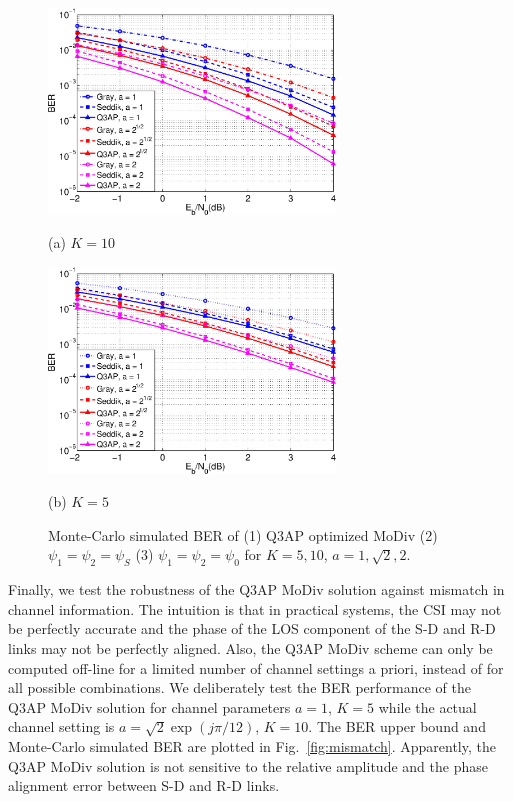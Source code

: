 \documentclass[journal,draftcls,onecolumn,12pt,twoside]{IEEEtran}
\begin{document}
\begin{figure}[!t]
    \begin{minipage}[b]{0.49\linewidth}
      \centering
      \centerline{\includegraphics[width=3.0in]{./figs/MC_10.eps}}
      \centerline{(a) $ K = 10$}\medskip
    \end{minipage}
    \hfill
    \begin{minipage}[b]{0.49\linewidth}
      \centering
      \centerline{\includegraphics[width=3.0in]{./figs/MC_5.eps}}
      \centerline{(b) $K=5$}\medskip
    \end{minipage}
    \caption{Monte-Carlo simulated BER of (1) Q3AP optimized MoDiv
    (2) $\psi_1 = \psi_2 = \psi_S$ (3) $\psi_1 = \psi_2 = \psi_0$ for $K = 5,
    10$, $a = 1, \sqrt{2}, 2$.}
    \label{fig:montecarlo}
\end{figure}

Finally, we test the robustness of the Q3AP MoDiv solution against mismatch in
channel information. The intuition is that in practical systems, the CSI may not
be perfectly accurate and the phase of the LOS component of the S-D and R-D
links may not be perfectly aligned. Also, the Q3AP MoDiv scheme can only be
computed off-line for a limited number of channel settings a priori, instead of
for all possible combinations. We deliberately test the BER performance of the
Q3AP MoDiv solution for channel parameters $a=1$, $K=5$ while the actual channel
setting is $a = \sqrt{2}\exp(j\pi/12)$, $K = 10$. The BER upper bound and
Monte-Carlo simulated BER are plotted in Fig.~\ref{fig:mismatch}. Apparently,
the Q3AP MoDiv solution is not sensitive to the relative amplitude and the phase
alignment error between S-D and R-D links.
\end{document}
